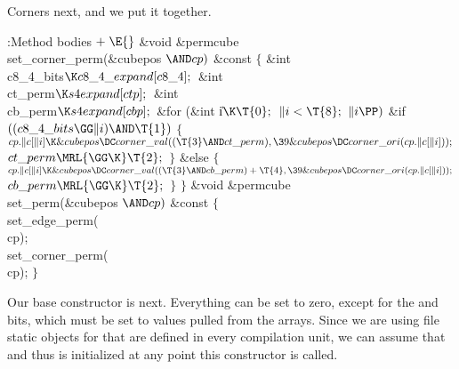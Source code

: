 Corners next, and we put it together.

\Y\B\4:Method bodies\X${}\mathrel+\E{}$\6
\&{void} \&{permcube}\DC\\{set\_corner\_perm}(\&{cubepos} ${}{\AND}\\{cp}){}$ %
\&{const}\1\1\2\2\6
${}\{{}$\1\6
\&{int} \\{c8\_4\_bits}${}\K\\{c8\_4\_expand}[\\{c8\_4}];{}$\6
\&{int} \\{ct\_perm}${}\K\\{s4expand}[\\{ctp}];{}$\6
\&{int} \\{cb\_perm}${}\K\\{s4expand}[\\{cbp}];{}$\7
\&{for} (\&{int} \|i${}\K\T{0};{}$ ${}\|i<\T{8};{}$ ${}\|i\PP){}$\1\6
\&{if} ${}((\\{c8\_4\_bits}\GG\|i)\AND\T{1}){}$\5
${}\{{}$\1\6
${}\\{cp}.\|c[\|i]\K\&{cubepos}\DC\\{corner\_val}((\T{3}\AND\\{ct\_perm}),\39%
\&{cubepos}\DC\\{corner\_ori}(\\{cp}.\|c[\|i]));{}$\6
${}\\{ct\_perm}\MRL{{\GG}{\K}}\T{2};{}$\6
\4${}\}{}$\2\6
\&{else}\5
${}\{{}$\1\6
${}\\{cp}.\|c[\|i]\K\&{cubepos}\DC\\{corner\_val}((\T{3}\AND\\{cb\_perm})+%
\T{4},\39\&{cubepos}\DC\\{corner\_ori}(\\{cp}.\|c[\|i]));{}$\6
${}\\{cb\_perm}\MRL{{\GG}{\K}}\T{2};{}$\6
\4${}\}{}$\2\2\6
\4${}\}{}$\2\7
\&{void} \&{permcube}\DC\\{set\_perm}(\&{cubepos} ${}{\AND}\\{cp}){}$ \&{const}%
\1\1\2\2\6
${}\{{}$\1\6
\\{set\_edge\_perm}(\\{cp});\6
\\{set\_corner\_perm}(\\{cp});\6
\4${}\}{}$\2\par
\fi

Our base constructor is next.  Everything can be set to zero, except
for the  and  bits, which must be set to values pulled
from
the  arrays.  Since we are using file static objects
for  that are defined in every compilation unit, we can assume
that  and thus  is initialized at any point
this
constructor is called.

